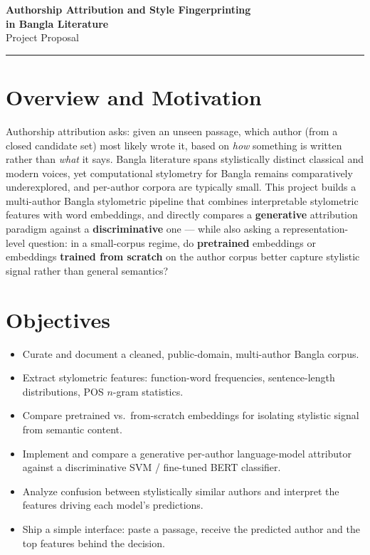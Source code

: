 \documentclass[11pt]{article}
\begin{document}
\begin{center}
    {\LARGE\bfseries Authorship Attribution and Style Fingerprinting\\ in Bangla Literature}\\[4pt]
    {\large\color{accent} Project Proposal}
\end{center}

\vspace{-4pt}
\hrule
\vspace{6pt}

\section{Overview and Motivation}
Authorship attribution asks: given an unseen passage, which author (from a closed candidate set) most likely wrote it, based on \emph{how} something is written rather than \emph{what} it says. Bangla literature spans stylistically distinct classical and modern voices, yet computational stylometry for Bangla remains comparatively underexplored, and per-author corpora are typically small. This project builds a multi-author Bangla stylometric pipeline that combines interpretable stylometric features with word embeddings, and directly compares a \textbf{generative} attribution paradigm against a \textbf{discriminative} one --- while also asking a representation-level question: in a small-corpus regime, do \textbf{pretrained} embeddings or embeddings \textbf{trained from scratch} on the author corpus better capture stylistic signal rather than general semantics?

\section{Objectives}
\begin{itemize}
    \item Curate and document a cleaned, public-domain, multi-author Bangla corpus.
    \item Extract stylometric features: function-word frequencies, sentence-length distributions, POS $n$-gram statistics.
    \item Compare pretrained vs.\ from-scratch embeddings for isolating stylistic signal from semantic content.
    \item Implement and compare a generative per-author language-model attributor against a discriminative SVM / fine-tuned BERT classifier.
    \item Analyze confusion between stylistically similar authors and interpret the features driving each model's predictions.
    \item Ship a simple interface: paste a passage, receive the predicted author and the top features behind the decision.
\end{itemize}
\end{document}
